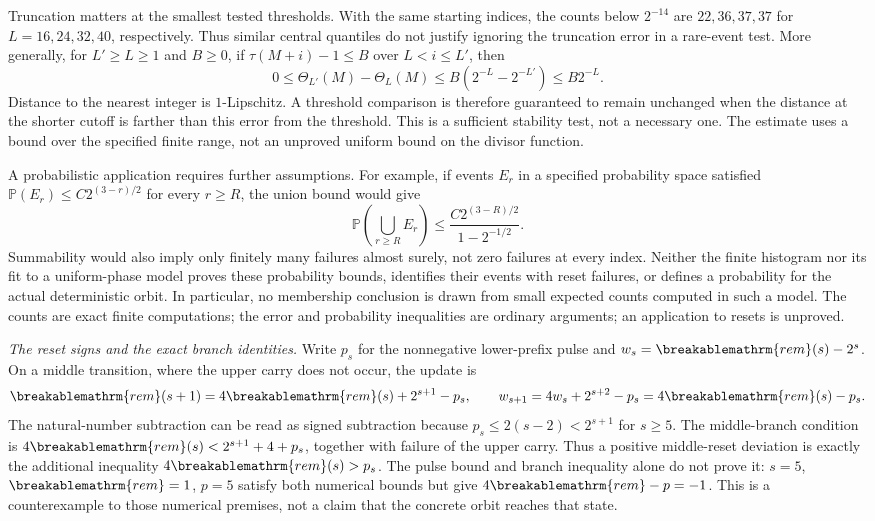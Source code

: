\documentclass[11pt]{article}
\theoremstyle{plain}
\theoremstyle{definition}
\theoremstyle{remark}
\renewcommand{\mathrm}[1]{\ifmmode\breakablemathrm{#1}\else\textrm{#1}\fi}%
\begin{document}
Truncation matters at the smallest tested thresholds.  With the
same starting indices, the counts below $2^{-14}$ are $22,36,37,37$
for $L=16,24,32,40$, respectively.  Thus similar central quantiles
do not justify ignoring the truncation error in a rare-event test.
More generally, for $L'\ge L\ge1$ and $B\ge0$, if
$\tau(M+i)-1\le B$ over $L<i\le L'$, then
\[
 0\le\Theta_{L'}(M)-\Theta_L(M)
 \le B(2^{-L}-2^{-L'})\le B2^{-L}.
\]
Distance to the nearest integer is $1$-Lipschitz.  A threshold
comparison is therefore guaranteed to remain unchanged when
the distance at the shorter cutoff is farther than this error
from the threshold.  This is a sufficient stability test, not a
necessary one.
The estimate uses a bound over the specified finite range, not an
unproved uniform bound on the divisor function.

A probabilistic application requires further assumptions.  For
example, if events $E_r$ in a specified probability space satisfied
$\mathbb P(E_r)\le C2^{(3-r)/2}$ for every $r\ge R$, the union
bound would give
\[
 \mathbb P\left(\bigcup_{r\ge R}E_r\right)
 \le \frac{C2^{(3-R)/2}}{1-2^{-1/2}}.
\]
Summability would also imply only finitely many failures almost
surely, not zero failures at every index.  Neither the finite
histogram nor its fit to a uniform-phase model proves these
probability bounds, identifies their events with reset failures,
or defines a probability for the actual deterministic orbit.
In particular, no membership conclusion is drawn from small
expected counts computed in such a model.  The counts are
exact finite computations; the error and probability inequalities are
ordinary arguments; an application to resets is unproved.

\emph{The reset signs and the exact branch identities.}
Write $p_s$ for the nonnegative lower-prefix pulse and
$w_s=\mathrm{rem}(s)-2^s$.  On a middle transition, where the upper
carry does not occur, the update is
\[
 \mathrm{rem}(s+1)=4\mathrm{rem}(s)+2^{s+1}-p_s,
 \qquad
 w_{s+1}=4w_s+2^{s+2}-p_s=4\mathrm{rem}(s)-p_s.
\]
The natural-number subtraction can be read as signed subtraction
because $p_s\le2(s-2)<2^{s+1}$ for $s\ge5$.
The middle-branch condition is
$4\mathrm{rem}(s)<2^{s+1}+4+p_s$, together with failure of the
upper carry.  Thus a positive middle-reset deviation is exactly the
additional inequality $4\mathrm{rem}(s)>p_s$.
The pulse bound and branch inequality alone do not prove it:
$s=5$, $\mathrm{rem}=1$, $p=5$ satisfy both numerical bounds but give
$4\mathrm{rem}-p=-1$.  This is a counterexample to those numerical
premises, not a claim that the concrete orbit reaches that state.
\end{document}
